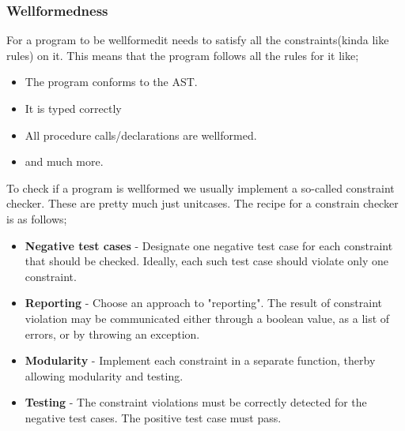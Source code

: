 \documentclass{article}
\begin{document}
            \subsubsection{Wellformedness}
                For a program to be \gls{wellformed}it needs to satisfy all the constraints(kinda like rules) on it. This means that the program follows all the rules 
                for it like; 
                \begin{itemize}
                    \item The program conforms to the AST.
                    \item It is typed correctly
                    \item All procedure calls/declarations are wellformed.
                    \item and much more.
                \end{itemize}
                To check if a program is wellformed we usually implement a so-called constraint checker. These are pretty much just unitcases.
                The recipe for a constrain checker is as follows;
                \begin{itemize}
                    \item \textbf{Negative test cases} - Designate one negative test case for each constraint that should be checked. 
                    Ideally, each such test case should violate only one constraint.
                    \item \textbf{Reporting} - Choose an approach to "reporting". The result of constraint violation may be communicated either through
                                            a boolean value, as a list of errors, or by throwing an exception.
                    \item \textbf{Modularity} - Implement each constraint in a separate function, therby allowing modularity and testing.
                    \item \textbf{Testing} - The constraint violations must be correctly detected for the negative test cases. The positive test case must pass.
                \end{itemize}
\end{document}
